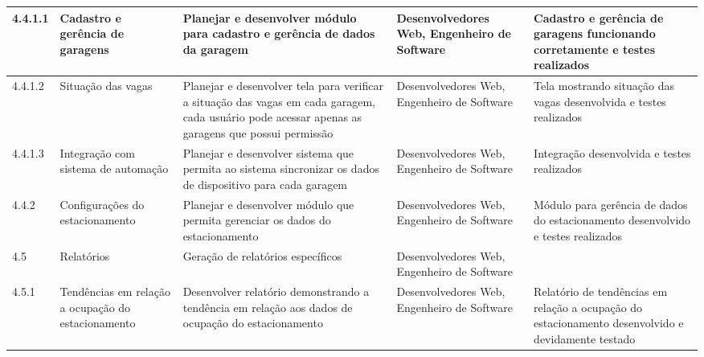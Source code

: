\begin{longtable}{  l  p{}  p{}  p{}  p{}  }
	\midrule
	4.4.1.1     & Cadastro e gerência de garagens                          & Planejar e desenvolver módulo para cadastro e gerência de dados da garagem                                                                                                     & Desenvolvedores Web, Engenheiro de Software                                                      & Cadastro e gerência de garagens funcionando corretamente e testes realizados                            \\*
	\midrule
	4.4.1.2     & Situação das vagas                                      & Planejar e desenvolver tela para verificar a situação das vagas em cada garagem, cada usuário pode acessar apenas as garagens que possui permissão                           & Desenvolvedores Web, Engenheiro de Software                                                      & Tela mostrando situação das vagas desenvolvida e testes realizados                                     \\*
	\midrule
	4.4.1.3     & Integração com sistema de automação                   & Planejar e desenvolver sistema que permita ao sistema sincronizar os dados de dispositivo para cada garagem                                                                      & Desenvolvedores Web, Engenheiro de Software                                                      & Integração desenvolvida e testes realizados                                                            \\*
	\midrule
	4.4.2       & Configurações do estacionamento                         & Planejar e desenvolver módulo que permita gerenciar os dados do estacionamento                                                                                                  & Desenvolvedores Web, Engenheiro de Software                                                      & Módulo para gerência de dados do estacionamento desenvolvido e testes realizados                       \\*
	\midrule
	4.5         & Relatórios                                               & Geração de relatórios específicos                                                                                                                                            & Desenvolvedores Web, Engenheiro de Software                                                      &                                                                                                          \\*
	\midrule
	4.5.1       & Tendências em relação a ocupação do estacionamento   & Desenvolver relatório demonstrando a tendência em relação aos dados de ocupação do estacionamento                                                                          & Desenvolvedores Web, Engenheiro de Software                                                      & Relatório de tendências em relação a ocupação do estacionamento desenvolvido e devidamente testado \\*

\end{longtable}
